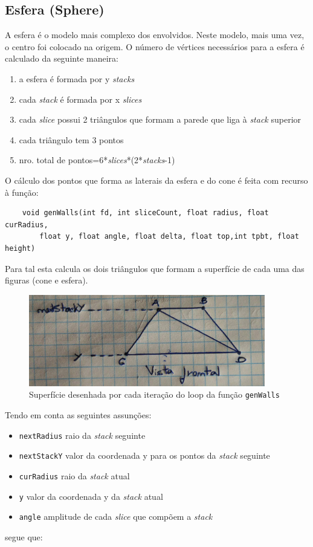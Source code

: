 \documentclass{article}
\begin{document}
\subsection{Esfera (Sphere)}
A esfera é o modelo mais complexo dos envolvidos. Neste modelo, mais uma vez, o centro foi colocado na origem. O número de vértices necessários para a esfera é calculado da seguinte maneira:
\begin{enumerate}
    \item a esfera é formada por y \textit{stacks}
    \item cada \textit{stack} é formada por x \textit{slices}
    \item cada \textit{slice} possui 2 triângulos que formam a parede que liga à \textit{stack} superior
    \item cada triângulo tem 3 pontos
    \item nro. total de pontos=6*\textit{slices}*(2*\textit{stacks}-1)
\end{enumerate}

O cálculo dos pontos que forma as laterais da esfera e do cone é feita com recurso à função:
\begin{Verbatim}
    void genWalls(int fd, int sliceCount, float radius, float curRadius, 
        float y, float angle, float delta, float top,int tpbt, float height)
\end{Verbatim}

Para tal esta calcula os dois triângulos que formam a superfície de cada uma das figuras (cone e esfera).
\begin{figure}[H]
    \centering
    \includegraphics[height=4cm]{genWallsDemo.jpg}
    \caption{Superfície desenhada por cada iteração do loop da função \texttt{genWalls}}
\end{figure}

Tendo em conta as seguintes assunções:
\begin{itemize}
    \item \texttt{nextRadius} raio da \textit{stack} seguinte
    \item \texttt{nextStackY} valor da coordenada y para os pontos da \textit{stack} seguinte
    \item \texttt{curRadius} raio da \textit{stack} atual
    \item \texttt{y} valor da coordenada y da \textit{stack} atual
    \item \texttt{angle} amplitude de cada \textit{slice} que compõem a \textit{stack}
\end{itemize}
segue que:
\\
\end{document}
